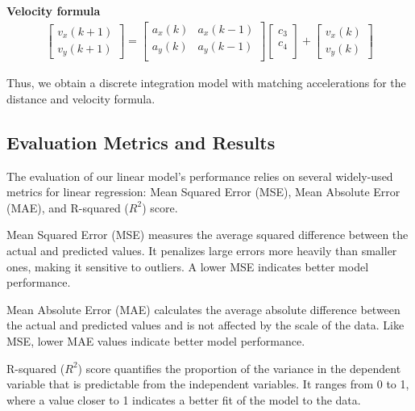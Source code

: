 \hfil

\textbf{Velocity formula}
\begin{align}
\label{eq:velocity_matrix}
    \begin{bmatrix}
        v_x(k+1) \\ 
        v_y(k+1) 
    \end{bmatrix}
    =
    \begin{bmatrix}
        a_x(k) & a_x(k-1)    \\ 
        a_y(k) & a_y(k-1)    \\
    \end{bmatrix}
    \begin{bmatrix}
        c_3 \\
        c_4 \\
   \end{bmatrix}
    +
    \begin{bmatrix}
        v_x(k) \\
        v_y(k) 
    \end{bmatrix}
\end{align}


Thus, we obtain a discrete integration model with matching accelerations for the distance and velocity formula.

\subsection{Evaluation Metrics and Results}

The evaluation of our linear model's performance relies on several widely-used metrics for linear regression: Mean Squared Error (MSE), Mean Absolute Error (MAE), and R-squared ($R^2$) score.

Mean Squared Error (MSE) measures the average squared difference between the actual and predicted values. It penalizes large errors more heavily than smaller ones, making it sensitive to outliers. A lower MSE indicates better model performance.

Mean Absolute Error (MAE) calculates the average absolute difference between the actual and predicted values and is 
not affected by the scale of the data. Like MSE, lower MAE values indicate better model performance.

R-squared ($R^2$) score quantifies the proportion of the variance in the dependent variable that is predictable 
from the independent variables. 
It ranges from 0 to 1, where a value closer to 1 indicates a better fit of the model to the data. 

